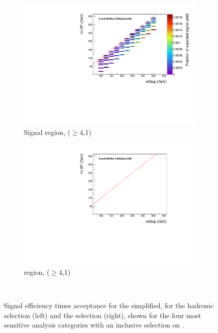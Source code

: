 \begin{figure}[ht!]
\begin{subfigure}[b]{0.47\textwidth}
    \includegraphics[width=\textwidth]{Figs/sms/t2cc/v37/effs/T2cc_had_eff_maps_eq1b_ge4j_SITV.pdf}
    \caption{Signal region, ($\geq 4$,1)}
    \label{fig:t2cc_sig_eff_ge4j_1b}
  \end{subfigure}
  \begin{subfigure}[b]{0.47\textwidth}
    \includegraphics[width=\textwidth]{Figs/sms/t2cc/v37/effs/T2cc_muon_eff_maps_eq1b_ge4j_SITV.pdf}
    \caption{\mj region, ($\geq 4$,1)}
    \label{fig:t2cc_mu_eff_ge4j_1b}
  \end{subfigure} \\
  \caption{Signal efficiency times acceptance for the \Ttwocc simplified, for 
  the hadronic selection (left) and the \mj selection (right), shown for the 
  four most sensitive analysis categories with an inclusive selection on \HT.}
  \label{fig:t2cc_eff}
\end{figure}

